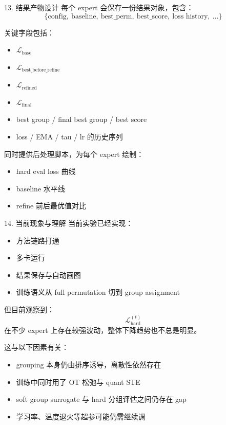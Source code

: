 \documentclass[aspectratio=169,professionalfonts]{ctexbeamer}
\newcommand{\Loss}{\mathcal{L}}
\begin{document}
\begin{frame}{13. 结果产物设计}
  每个 expert 会保存一份结果对象，包含：
  \[
    \{\text{config},\ \text{baseline},\ \text{best\_perm},\ \text{best\_score},\ \text{loss history},\ \dots\}
  \]

  关键字段包括：
  \begin{itemize}
    \item $\Loss_{\mathrm{base}}$
    \item $\Loss_{\mathrm{best\_before\_refine}}$
    \item $\Loss_{\mathrm{refined}}$
    \item $\Loss_{\mathrm{final}}$
    \item best group / final best group / best score
    \item loss / EMA / tau / lr 的历史序列
  \end{itemize}

  同时提供后处理脚本，为每个 expert 绘制：
  \begin{itemize}
    \item hard eval loss 曲线
    \item baseline 水平线
    \item refine 前后最优值对比
  \end{itemize}
\end{frame}

\begin{frame}{14. 当前现象与理解}
  当前实验已经实现：
  \begin{itemize}
    \item 方法链路打通
    \item 多卡运行
    \item 结果保存与自动画图
    \item 训练语义从 full permutation 切到 group assignment
  \end{itemize}

  但目前观察到：
  \[
    \Loss_{\mathrm{hard}}^{(t)}
  \]
  在不少 expert 上存在较强波动，整体下降趋势也不总是明显。

  \vspace{0.4em}
  这与以下因素有关：
  \begin{itemize}
    \item grouping 本身仍由排序诱导，离散性依然存在
    \item 训练中同时用了 OT 松弛与 quant STE
    \item soft group surrogate 与 hard 分组评估之间仍存在 gap
    \item 学习率、温度退火等超参可能仍需继续调
  \end{itemize}
\end{frame}
\end{document}
